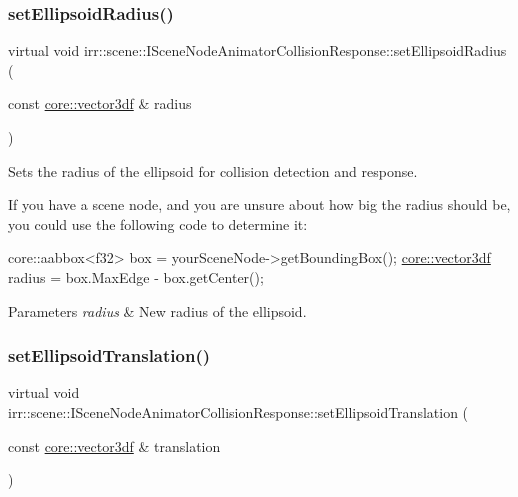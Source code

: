 \subsubsection{\texorpdfstring{set\+Ellipsoid\+Radius()}{setEllipsoidRadius()}\hspace{0.1cm}{\footnotesize\ttfamily [2/2]}}
{\footnotesize\ttfamily virtual void irr\+::scene\+::\+I\+Scene\+Node\+Animator\+Collision\+Response\+::set\+Ellipsoid\+Radius (\begin{DoxyParamCaption}\item[{const \hyperlink{namespaceirr_1_1core_ae6e2b2a6c552833ebbd5b7463d03586b}{core\+::vector3df} \&}]{radius }\end{DoxyParamCaption})\hspace{0.3cm}{\ttfamily [pure virtual]}}



Sets the radius of the ellipsoid for collision detection and response. 

If you have a scene node, and you are unsure about how big the radius should be, you could use the following code to determine it\+: 
\begin{DoxyCode}
core::aabbox<f32> box = yourSceneNode->getBoundingBox();
\hyperlink{namespaceirr_1_1core_ae6e2b2a6c552833ebbd5b7463d03586b}{core::vector3df} radius = box.MaxEdge - box.getCenter();
\end{DoxyCode}
 
\begin{DoxyParams}{Parameters}
{\em radius} & New radius of the ellipsoid. \\
\hline
\end{DoxyParams}
\mbox{\label{classirr_1_1scene_1_1ISceneNodeAnimatorCollisionResponse_a234ec747d320d70dd3e2a4143782ffc7}} 
\subsubsection{\texorpdfstring{set\+Ellipsoid\+Translation()}{setEllipsoidTranslation()}\hspace{0.1cm}{\footnotesize\ttfamily [1/2]}}
{\footnotesize\ttfamily virtual void irr\+::scene\+::\+I\+Scene\+Node\+Animator\+Collision\+Response\+::set\+Ellipsoid\+Translation (\begin{DoxyParamCaption}\item[{const \hyperlink{namespaceirr_1_1core_ae6e2b2a6c552833ebbd5b7463d03586b}{core\+::vector3df} \&}]{translation }\end{DoxyParamCaption})\hspace{0.3cm}{\ttfamily [pure virtual]}}



